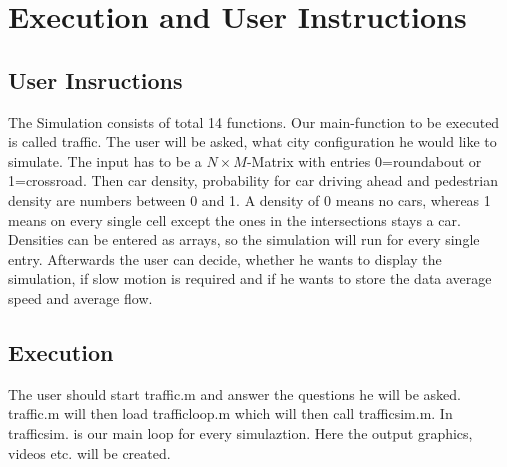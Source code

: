 \section{Execution and User Instructions}
\subsection{User Insructions}
The Simulation consists of total 14 functions. Our main-function to be executed is called traffic. 
The user will be asked, what city configuration he would like to simulate. The input has to be a $N \times M$-Matrix with entries 0=roundabout or 1=crossroad. 
Then car density, probability for car driving ahead and pedestrian density are numbers between 0 and 1. A density of 0 means no cars, whereas 1 means on every single cell except the ones in the intersections stays a car. 
Densities can be entered as arrays, so the simulation will run for every single entry. 
Afterwards the user can decide, whether he wants to display the simulation, if slow motion is required and if he wants to store the data average speed and average flow. \\
\subsection{Execution}
The user should start traffic.m and answer the questions he will be asked. traffic.m will then load trafficloop.m which will then call trafficsim.m. In trafficsim. is our main loop for every simulaztion. 
Here the output graphics, videos etc. will be created. 
